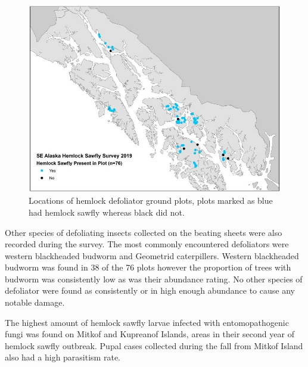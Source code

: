 \begin{figure}[H]
\begin{center}
\includegraphics[width=16cm]{img/hemlock_sawfly_plot_map.jpg}
\caption{Locations of hemlock defoliator ground plots, plots marked as blue had hemlock sawfly whereas black did not.}
\label{hemlock_sawfly_plot_map}
\end{center}
\end{figure} 
\begin{multicols}{2}


 
Other species of defoliating insects collected on the beating sheets were also recorded during the survey.  The most commonly encountered defoliators were western blackheaded budworm and Geometrid caterpillers.  Western blackheaded budworm was found in 38 of the 76 plots however the proportion of trees with budworm was consistently low as was their abundance rating.  No other species of defoliator were found as consistently or in high enough abundance to cause any notable damage. 
 
The highest amount of hemlock sawfly larvae infected with entomopathogenic fungi was found on Mitkof and Kupreanof Islands, areas in their second year of hemlock sawfly outbreak.  Pupal cases collected during the fall from Mitkof Island also had a high parasitism rate.




\end{multicols}
